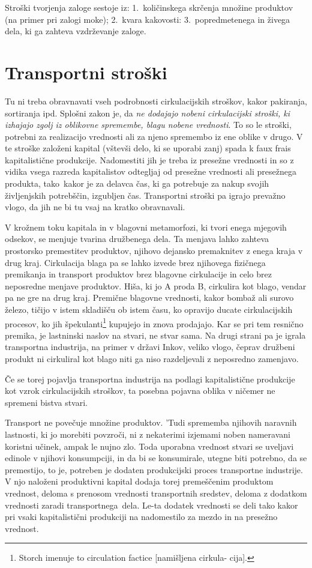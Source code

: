 \documentclass[kapital_02.tex]{subfiles}
\begin{document}
Stroški tvorjenja zaloge sestoje iz: 1.\ količinskega skrčenja množine produktov (na primer pri zalogi moke); 2.\ kvara kakovosti: 3.\ popredmetenega in živega dela, ki ga zahteva vzdrževanje zaloge.

\section{Transportni stroški}
Tu ni treba obravnavati vseh podrobnosti cirkulacijskih stroškov, kakor pakiranja, sortiranja ipd.
Splošni zakon je, da \emph{ne dodajajo nobeni cirkulacijski stroški, ki izhajajo zgolj iz oblikovne spremembe, blagu nobene vrednosti}.
To so le stroški, potrebni za realizacijo vrednosti ali za njeno spremembo iz ene oblike v drugo.
V te stroške založeni kapital (vštevši delo, ki se uporabi zanj) spada k faux frais kapitalistične produkcije.
Nadomestiti jih je treba iz presežne vrednosti in so z vidika vsega razreda kapitalistov odtegljaj od presežne vrednosti ali presežnega produkta, tako\KPEstran\ kakor je za delavca čas, ki ga potrebuje za nakup svojih življenjskih potrebščin, izgubljen čas.
Transportni stroški pa igrajo prevažno vlogo, da jih ne bi tu vsaj na kratko obravnavali.

V krožnem toku kapitala in v blagovni metamorfozi, ki tvori enega mjegovih odsekov, se menjuje tvarina družbenega dela. 
Ta menjava lahko zahteva prostorsko premestitev produktov, njihovo dejansko premaknitev z enega kraja v drug kraj. 
Cirkulacija blaga pa se lahko izvede brez njihovega fizičnega premikanja in transport produktov brez blagovne cirkulacije in celo brez neposredne menjave produktov.
Hiša, ki jo A proda B, cirkulira kot blago, vendar pa ne gre na drug kraj.
Premične blagovne vrednosti, kakor bombaž ali surovo železo, tičijo v istem skladišču ob istem času, ko opravijo ducate cirkulacijskih procesov, ko jih špekulanti\footnote
{Storch imenuje to circulation factice [namišljena cirkula-
cija].}
kupujejo in znova prodajajo.
Kar se pri tem resnično premika, je lastninski naslov na stvari, ne stvar sama.
Na drugi strani pa je igrala transportna industrija, na primer v državi Inkov, veliko vlogo, čeprav družbeni produkt ni cirkuliral kot blago niti ga niso razdeljevali z neposredno zamenjavo.

Če se torej pojavlja transportna industrija na podlagi kapitalistične produkcije kot vzrok cirkulacijskih stroškov, ta posebna pojavna oblika v ničemer ne spremeni bistva stvari.

Transport ne povečuje množine produktov. 'Tudi sprememba njihovih naravnih lastnosti, ki jo morebiti povzroči, ni z nekaterimi izjemami noben nameravani koristni učinek, ampak le nujno zlo.
Toda uporabna vrednost stvari se uveljavi edinole v njihovi konsumpciji, in da bi se konsumirale, utegne biti potrebno, da se premestijo, to je, potreben je dodaten produkcijski proces transportne industrije.
V njo naloženi produktivni kapital dodaja torej premeščenim produktom vrednost, deloma s prenosom vrednosti transportnih sredstev, deloma z dodatkom vrednosti zaradi transportnega\KPEstran\ dela.
Le-ta dodatek vrednosti se deli tako kakor pri vsaki kapitalistični produkciji na nadomestilo za mezdo in na presežno vrednost.
\end{document}
